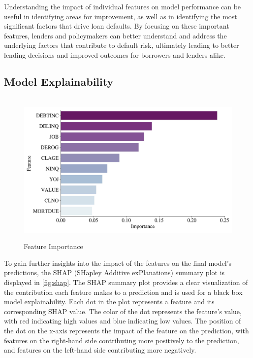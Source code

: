 Understanding the impact of individual features on model performance can be useful in identifying areas for improvement, as well as in identifying the most significant factors that drive loan defaults.
By focusing on these important features, lenders and policymakers can better understand and address the underlying factors that contribute to default risk, ultimately leading to better lending decisions and improved outcomes for borrowers and lenders alike.

\subsection{Model Explainability}

\begin{figure}[H]
\centering
\caption{Feature Importance}\vspace{0.5em}
\label{fig:fi}\
\includegraphics[width=140mm]{Figures/Feature_Importances.jpg}
\vspace{-1em}
\end{figure}

To gain further insights into the impact of the features on the final model's predictions, the SHAP (SHapley Additive exPlanations) summary plot is displayed in \autoref{fig:shap}.
The SHAP summary plot provides a clear visualization of the contribution each feature makes to a prediction and is used for a black box model explainability.
Each dot in the plot represents a feature and its corresponding SHAP value.
The color of the dot represents the feature's value, with red indicating high values and blue indicating low values.
The position of the dot on the x-axis represents the impact of the feature on the prediction, with features on the right-hand side contributing more positively to the prediction, and features on the left-hand side contributing more negatively.

